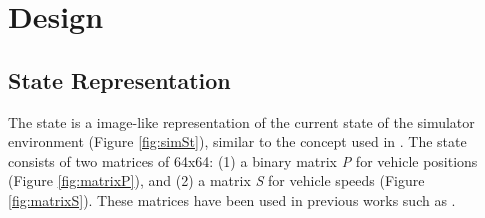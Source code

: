 \documentclass{llncs}
\begin{document}
\section{Design}

\subsection{State Representation}\label{sec:stateRep}

	The state is a image-like representation of the current state of the simulator environment (Figure \ref{fig:simSt}), similar to the concept used in \cite{Mnih2015}. The state consists of two matrices of 64x64: (1) a binary matrix \textit{P} for vehicle positions (Figure \ref{fig:matrixP}), and (2) a matrix \textit{S} for vehicle speeds (Figure \ref{fig:matrixS}). These matrices have been used in previous works such as \cite{Gao2017,Liang2018,Liu2017CooperativeDR,VanDerPol2016}. 
	
\end{document}
